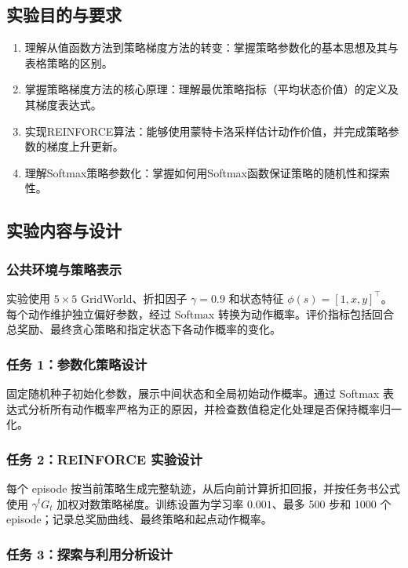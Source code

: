 \documentclass[11pt,a4paper,UTF8]{ctexart}
\numberwithin{figure}{section}
\numberwithin{table}{section}
\begin{document}
\subsection{实验目的与要求}

\begin{enumerate}
\item 理解从值函数方法到策略梯度方法的转变：掌握策略参数化的基本思想及其与表格策略的区别。
\item 掌握策略梯度方法的核心原理：理解最优策略指标（平均状态价值）的定义及其梯度表达式。
\item 实现REINFORCE算法：能够使用蒙特卡洛采样估计动作价值，并完成策略参数的梯度上升更新。
\item 理解Softmax策略参数化：掌握如何用Softmax函数保证策略的随机性和探索性。
\end{enumerate}
\subsection{实验内容与设计}

\subsubsection{公共环境与策略表示}

实验使用 $5\times5$ GridWorld、折扣因子 $\gamma=0.9$ 和状态特征 $\phi(s)=[1,x,y]^\top$。每个动作维护独立偏好参数，经过 Softmax 转换为动作概率。评价指标包括回合总奖励、最终贪心策略和指定状态下各动作概率的变化。

\subsubsection{任务 1：参数化策略设计}

固定随机种子初始化参数，展示中间状态和全局初始动作概率。通过 Softmax 表达式分析所有动作概率严格为正的原因，并检查数值稳定化处理是否保持概率归一化。

\subsubsection{任务 2：REINFORCE 实验设计}

每个 episode 按当前策略生成完整轨迹，从后向前计算折扣回报，并按任务书公式使用 $\gamma^tG_t$ 加权对数策略梯度。训练设置为学习率 $0.001$、最多 500 步和 1000 个 episode；记录总奖励曲线、最终策略和起点动作概率。

\subsubsection{任务 3：探索与利用分析设计}
\end{document}
